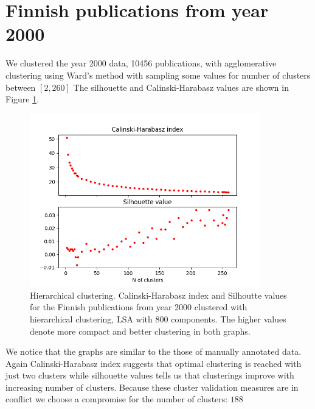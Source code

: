 

\section{Finnish publications from year 2000}
We clustered the year 2000 data, 10456 publications, with 
agglomerative clustering using Ward's method with sampling some values
for number of clusters between $[2,260]$ 
The silhouette and Calinski-Harabasz values are shown in Figure 
\ref{fig:ch-silh-2000-h}.
\begin{figure}[ht]
  \begin{center}    
\includegraphics[width=10cm]{images/c-h-silh-index-plot-y2000-2_260-800-hierarchical.png}
    \caption{Hierarchical clustering. Calinski-Harabasz index and Silhoutte values for the
    Finnish publications from year 2000 clustered with hierarchical
    clustering, LSA with 800 components. The higher values denote 
    more compact and better clustering in both graphs.}
    \label{fig:ch-silh-2000-h}
  \end{center}
\end{figure}
We notice that the graphs are similar to the those of manually
annotated data. Again Calinski-Harabasz index suggests that 
optimal clustering is reached with just two clusters while 
silhouette values tells us that clusterings improve with increasing
number of clusters. Because these cluster validation measures are
in conflict we choose a compromise for the number of clusters: $188$


